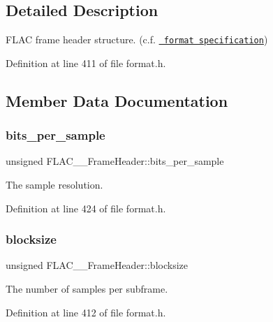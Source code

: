 \subsection{Detailed Description}
F\+L\+AC frame header structure. (c.\+f. \href{../format.html\#frame_header}{\texttt{ format specification}}) 

Definition at line 411 of file format.\+h.



\subsection{Member Data Documentation}
\mbox{\label{struct_f_l_a_c_____frame_header_ae1f4af58cbbb837adf670d12bc4e86f3}} 
\subsubsection{\texorpdfstring{bits\_per\_sample}{bits\_per\_sample}}
{\footnotesize\ttfamily unsigned F\+L\+A\+C\+\_\+\+\_\+\+Frame\+Header\+::bits\+\_\+per\+\_\+sample}

The sample resolution. 

Definition at line 424 of file format.\+h.

\mbox{\label{struct_f_l_a_c_____frame_header_ace760def6dcbbde3d9d140e5bfda34b3}} 
\subsubsection{\texorpdfstring{blocksize}{blocksize}}
{\footnotesize\ttfamily unsigned F\+L\+A\+C\+\_\+\+\_\+\+Frame\+Header\+::blocksize}

The number of samples per subframe. 

Definition at line 412 of file format.\+h.

\mbox{\label{struct_f_l_a_c_____frame_header_a9a31f752e16da9d690f8d5ff85aed89c}} 
